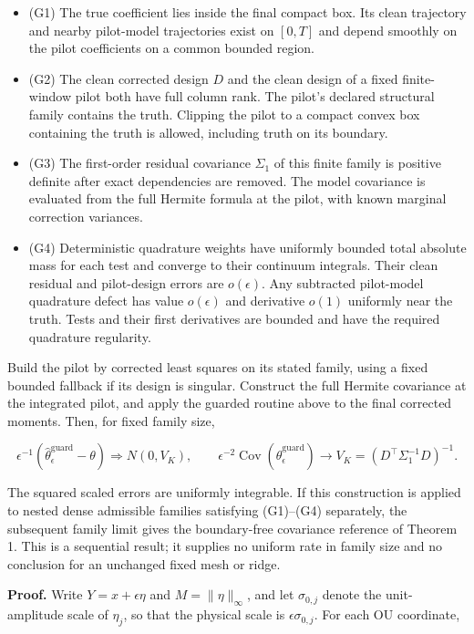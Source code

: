 \documentclass[
  american,
  11pt,
]{article}
\providecommand{\tightlist}{%
  \setlength{\itemsep}{0pt}\setlength{\parskip}{0pt}}
\begin{document}
\begin{itemize}
\tightlist
\item
  (G1) The true coefficient lies inside the final compact box. Its clean
  trajectory and nearby pilot-model trajectories exist on \([0,T]\) and
  depend smoothly on the pilot coefficients on a common bounded region.
\item
  (G2) The clean corrected design \(D\) and the clean design of a fixed
  finite-window pilot both have full column rank. The pilot's declared
  structural family contains the truth. Clipping the pilot to a compact
  convex box containing the truth is allowed, including truth on its
  boundary.
\item
  (G3) The first-order residual covariance \(\Sigma_1\) of this finite
  family is positive definite after exact dependencies are removed. The
  model covariance is evaluated from the full Hermite formula at the
  pilot, with known marginal correction variances.
\item
  (G4) Deterministic quadrature weights have uniformly bounded total
  absolute mass for each test and converge to their continuum integrals.
  Their clean residual and pilot-design errors are \(o(\epsilon)\). Any
  subtracted pilot-model quadrature defect has value \(o(\epsilon)\) and
  derivative \(o(1)\) uniformly near the truth. Tests and their first
  derivatives are bounded and have the required quadrature regularity.
\end{itemize}

Build the pilot by corrected least squares on its stated family, using a
fixed bounded fallback if its design is singular. Construct the full
Hermite covariance at the integrated pilot, and apply the guarded
routine above to the final corrected moments. Then, for fixed family
size,

\[
\epsilon^{-1}(\widehat\theta_\epsilon^{\mathrm{guard}}-\theta)
\Rightarrow N(0,V_K),\qquad
\epsilon^{-2}\operatorname{Cov}(\widehat\theta_\epsilon^{\mathrm{guard}})
\longrightarrow V_K=(D^\top\Sigma_1^{-1}D)^{-1}.
\]

The squared scaled errors are uniformly integrable. If this construction
is applied to nested dense admissible families satisfying (G1)--(G4)
separately, the subsequent family limit gives the boundary-free
covariance reference of Theorem 1. This is a sequential result; it
supplies no uniform rate in family size and no conclusion for an
unchanged fixed mesh or ridge.

\textbf{Proof.} Write \(Y=x+\epsilon\eta\) and \(M=\|\eta\|_\infty\),
and let \(\sigma_{0,j}\) denote the unit-amplitude scale of \(\eta_j\),
so that the physical scale is \(\epsilon\sigma_{0,j}\). For each OU
coordinate,
\end{document}
